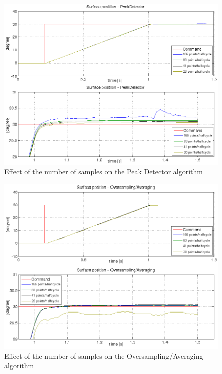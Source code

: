 \documentclass[conference]{IEEEtran}
\begin{document}
\begin{figure}[h!]
\centering
\includegraphics[scale=0.32]{pics/results/pointvar_peakdetector.png}
\caption{Effect of the number of samples on the Peak Detector algorithm}
\label{fig:pointvar_peakdetector}
\end{figure}

\begin{figure}[h!]
\centering
\includegraphics[scale=0.32]{pics/results/pointvar_oversampling.png}
\caption{Effect of the number of samples on the Oversampling/Averaging algorithm}
\label{fig:pointvar_oversampling}
\end{figure}
\end{document}
